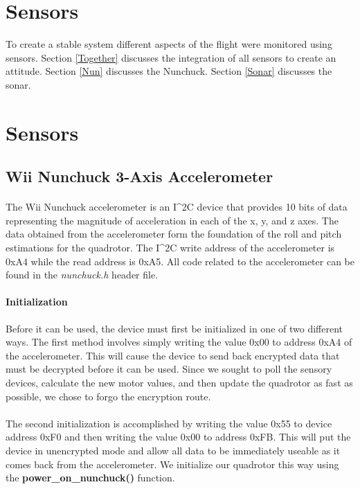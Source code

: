 \section{Sensors}
To create a stable system different aspects of the flight were monitored using sensors. Section \ref{Together} discusses the integration of all sensors to create an attitude. Section \ref{Nun} discusses the Nunchuck. Section \ref{Sonar} discusses the sonar. 

\section{Sensors}

\subsection{Wii Nunchuck 3-Axis Accelerometer}

\paragraph{}
The Wii Nunchuck accelerometer is an I^{2}C device that provides 10 bits of data representing the magnitude of acceleration in each of the x, y, and z axes.  The data obtained from the accelerometer form the foundation of the roll and pitch estimations for the quadrotor.  The I^{2}C write address of the accelerometer is 0xA4 while the read address is 0xA5.  All code related to the accelerometer can be found in the {\it nunchuck.h} header file.

\paragraph{Initialization}
Before it can be used, the device must first be initialized in one of two different ways.  The first method involves simply writing the value 0x00 to address 0xA4 of the accelerometer.  This will cause the device to send back encrypted data that must be decrypted before it can be used.  Since we sought to poll the sensory devices, calculate the new motor values, and then update the quadrotor as fast as possible, we chose to forgo the encryption route.

\paragraph{}
The second initialization is accomplished by writing the value 0x55 to device address 0xF0 and then writing the value 0x00 to address 0xFB.  This will put the device in unencrypted mode and allow all data to be immediately useable as it comes back from the accelerometer.  We initialize our quadrotor this way using the {\bf power_on_nunchuck()} function.

